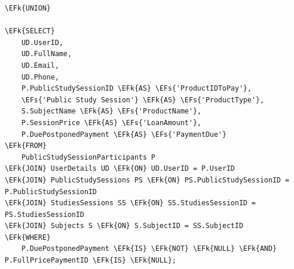 \documentclass[11pt]{article}
\newcommand{\EFs}[1]{\textcolor{EFs}{#1}} %
\newcommand{\EFk}[1]{\textcolor{EFk}{\textbf{#1}}} %
\begin{document}
\begin{Code}
\begin{Verbatim}
\EFk{UNION}

\EFk{SELECT} 
    UD.UserID,
    UD.FullName,
    UD.Email,
    UD.Phone,
    P.PublicStudySessionID \EFk{AS} \EFs{'ProductIDToPay'},
    \EFs{'Public Study Session'} \EFk{AS} \EFs{'ProductType'},
    S.SubjectName \EFk{AS} \EFs{'ProductName'},
    P.SessionPrice \EFk{AS} \EFs{'LoanAmount'},
    P.DuePostponedPayment \EFk{AS} \EFs{'PaymentDue'}
\EFk{FROM} 
    PublicStudySessionParticipants P
\EFk{JOIN} UserDetails UD \EFk{ON} UD.UserID = P.UserID
\EFk{JOIN} PublicStudySessions PS \EFk{ON} PS.PublicStudySessionID = P.PublicStudySessionID
\EFk{JOIN} StudiesSessions SS \EFk{ON} SS.StudiesSessionID = PS.StudiesSessionID
\EFk{JOIN} Subjects S \EFk{ON} S.SubjectID = SS.SubjectID
\EFk{WHERE} 
    P.DuePostponedPayment \EFk{IS} \EFk{NOT} \EFk{NULL} \EFk{AND} P.FullPricePaymentID \EFk{IS} \EFk{NULL};
\end{Verbatim}
\end{Code}
\end{document}
